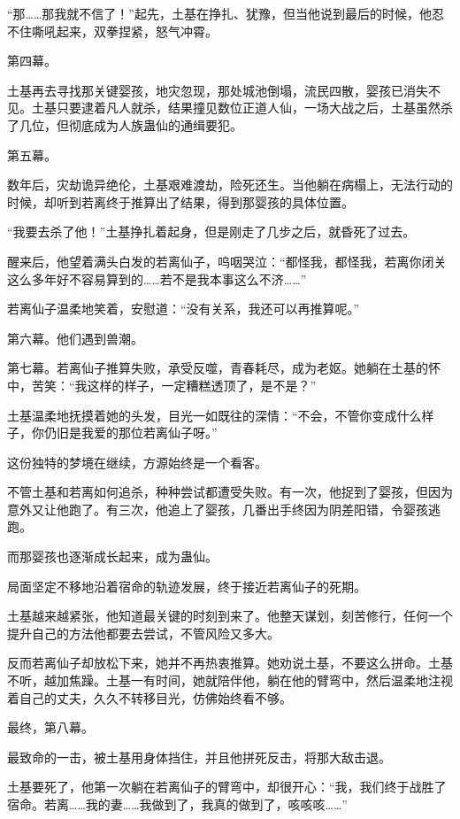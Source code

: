 \begin{this_body}
“那……那我就不信了！”起先，土基在挣扎、犹豫，但当他说到最后的时候，他忍不住嘶吼起来，双拳捏紧，怒气冲霄。

第四幕。

土基再去寻找那关键婴孩，地灾忽现，那处城池倒塌，流民四散，婴孩已消失不见。土基只要逮着凡人就杀，结果撞见数位正道人仙，一场大战之后，土基虽然杀了几位，但彻底成为人族蛊仙的通缉要犯。

第五幕。

数年后，灾劫诡异绝伦，土基艰难渡劫，险死还生。当他躺在病榻上，无法行动的时候，却听到若离终于推算出了结果，得到那婴孩的具体位置。

“我要去杀了他！”土基挣扎着起身，但是刚走了几步之后，就昏死了过去。

醒来后，他望着满头白发的若离仙子，呜咽哭泣：“都怪我，都怪我，若离你闭关这么多年好不容易算到的……若不是我本事这么不济……”

若离仙子温柔地笑着，安慰道：“没有关系，我还可以再推算呢。”

第六幕。他们遇到兽潮。

第七幕。若离仙子推算失败，承受反噬，青春耗尽，成为老妪。她躺在土基的怀中，苦笑：“我这样的样子，一定糟糕透顶了，是不是？”

土基温柔地抚摸着她的头发，目光一如既往的深情：“不会，不管你变成什么样子，你仍旧是我爱的那位若离仙子呀。”

这份独特的梦境在继续，方源始终是一个看客。

不管土基和若离如何追杀，种种尝试都遭受失败。有一次，他捉到了婴孩，但因为意外又让他跑了。有三次，他追上了婴孩，几番出手终因为阴差阳错，令婴孩逃跑。

而那婴孩也逐渐成长起来，成为蛊仙。

局面坚定不移地沿着宿命的轨迹发展，终于接近若离仙子的死期。

土基越来越紧张，他知道最关键的时刻到来了。他整天谋划，刻苦修行，任何一个提升自己的方法他都要去尝试，不管风险又多大。

反而若离仙子却放松下来，她并不再热衷推算。她劝说土基，不要这么拼命。土基不听，越加焦躁。土基一有时间，她就陪伴他，躺在他的臂弯中，然后温柔地注视着自己的丈夫，久久不转移目光，仿佛始终看不够。

最终，第八幕。

最致命的一击，被土基用身体挡住，并且他拼死反击，将那大敌击退。

土基要死了，他第一次躺在若离仙子的臂弯中，却很开心：“我，我们终于战胜了宿命。若离……我的妻……我做到了，我真的做到了，咳咳咳……”


\end{this_body}
